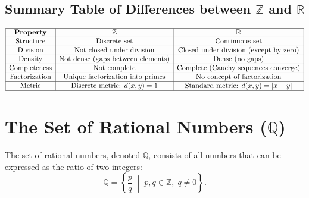 \subsection{Summary Table of Differences between $\mathbb{Z}$ and $\mathbb{R}$}
\[
\begin{array}{|c|c|c|}
\hline
\textbf{Property} & \mathbb{Z} & \mathbb{R} \\
\hline
\text{Structure} & \text{Discrete set} & \text{Continuous set} \\
\hline
\text{Division} & \text{Not closed under division} & \text{Closed under division (except by zero)} \\
\hline
\text{Density} & \text{Not dense (gaps between elements)} & \text{Dense (no gaps)} \\
\hline
\text{Completeness} & \text{Not complete} & \text{Complete (Cauchy sequences converge)} \\
\hline
\text{Factorization} & \text{Unique factorization into primes} & \text{No concept of factorization} \\
\hline
\text{Metric} & \text{Discrete metric: } d(x, y) = 1 & \text{Standard metric: } d(x, y) = |x - y| \\
\hline
\end{array}
\]

\section{The Set of Rational Numbers (\( \mathbb{Q} \))}
The set of rational numbers, denoted \( \mathbb{Q} \), consists of all numbers that can be expressed as the ratio of two integers:
\[
\mathbb{Q} = \left\{ \frac{p}{q} \; \middle| \; p, q \in \mathbb{Z}, \; q \neq 0 \right\}.
\]

